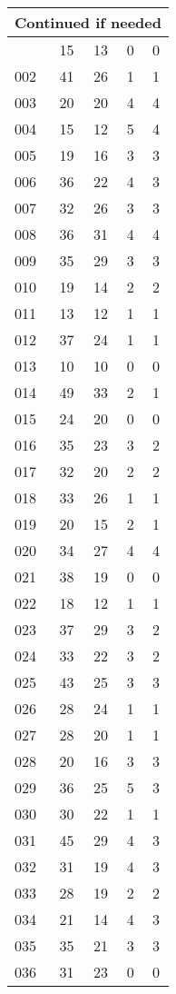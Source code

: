 \begin{center}
\begin{longtable}{l|c|c|c|c}
\hline \multicolumn{5}{|r|}{{Continued if needed}} \\ \hline
\endfoot 
001 & 15 & 13 & 0 & 0\\ \hline
002 & 41 & 26 & 1 & 1\\ \hline
003 & 20 & 20 & 4 & 4\\ \hline
004 & 15 & 12 & 5 & 4\\ \hline
005 & 19 & 16 & 3 & 3\\ \hline
006 & 36 & 22 & 4 & 3\\ \hline
007 & 32 & 26 & 3 & 3\\ \hline
008 & 36 & 31 & 4 & 4\\ \hline
009 & 35 & 29 & 3 & 3\\ \hline
010 & 19 & 14 & 2 & 2\\ \hline
011 & 13 & 12 & 1 & 1\\ \hline
012 & 37 & 24 & 1 & 1\\ \hline
013 & 10 & 10 & 0 & 0\\ \hline
014 & 49 & 33 & 2 & 1\\ \hline
015 & 24 & 20 & 0 & 0\\ \hline
016 & 35 & 23 & 3 & 2\\ \hline
017 & 32 & 20 & 2 & 2\\ \hline
018 & 33 & 26 & 1 & 1\\ \hline
019 & 20 & 15 & 2 & 1\\ \hline
020 & 34 & 27 & 4 & 4\\ \hline
021 & 38 & 19 & 0 & 0\\ \hline
022 & 18 & 12 & 1 & 1\\ \hline
023 & 37 & 29 & 3 & 2\\ \hline
024 & 33 & 22 & 3 & 2\\ \hline
025 & 43 & 25 & 3 & 3\\ \hline
026 & 28 & 24 & 1 & 1\\ \hline
027 & 28 & 20 & 1 & 1\\ \hline
028 & 20 & 16 & 3 & 3\\ \hline
029 & 36 & 25 & 5 & 3\\ \hline
030 & 30 & 22 & 1 & 1\\ \hline
031 & 45 & 29 & 4 & 3\\ \hline
032 & 31 & 19 & 4 & 3\\ \hline
033 & 28 & 19 & 2 & 2\\ \hline
034 & 21 & 14 & 4 & 3\\ \hline
035 & 35 & 21 & 3 & 3\\ \hline
036 & 31 & 23 & 0 & 0\\ \hline

\end{longtable}
\end{center}
